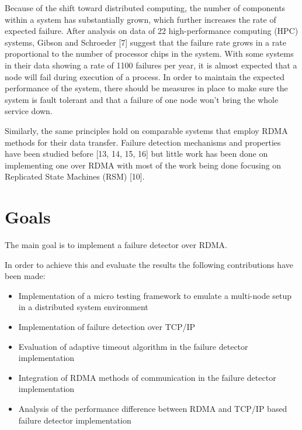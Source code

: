 \documentclass[bsc,frontabs,twoside,singlespacing,parskip,deptreport,hidel]{infthesis}     %
\begin{document}
Because of the shift toward distributed computing, the number of components within a system has substantially grown, which further increases the rate of expected failure. After analysis on data of 22 high-performance computing (HPC) systems, Gibson and Schroeder [7] suggest that the failure rate grows in a rate proportional to the number of processor chips in the system. With some systems in their data showing a rate of 1100 failures per year, it is almost expected that a node will fail during execution of a process. In order to maintain the expected performance of the system, there should be measures in place to make sure the system is fault tolerant and that a failure of one node won’t bring the whole service down.

Similarly, the same principles hold on comparable systems that employ RDMA methods for their data transfer. Failure detection mechanisms and properties have been studied before [13, 14, 15, 16] but little work has been done on implementing one over RDMA with most of the work being done focusing on Replicated State Machines (RSM) [10].


\section{Goals}

The main goal is to implement a failure detector over RDMA.

In order to achieve this and evaluate the results the following contributions have been made:

\begin{itemize}
  \item Implementation of a micro testing framework to emulate a multi-node setup in a distributed system environment
  \item Implementation of failure detection over TCP/IP
  \item Evaluation of adaptive timeout algorithm in the failure detector implementation
  \item Integration of RDMA methods of communication in the failure detector implementation
  \item Analysis of the performance difference between RDMA and TCP/IP based failure detector implementation
\end{itemize}


\end{document}
